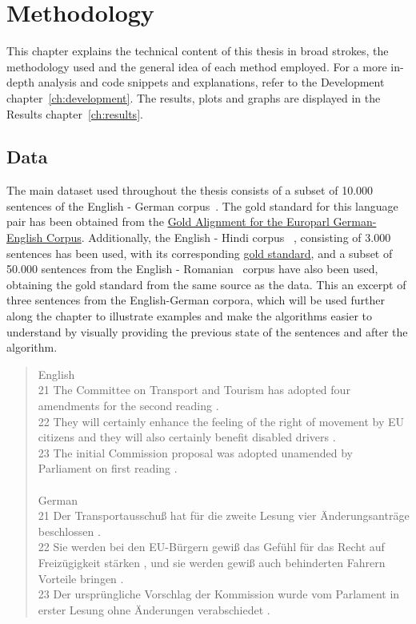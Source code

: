 %
%

\chapter{Methodology}\label{ch:methodology}

This chapter explains the technical content of this thesis in broad strokes, the methodology used and the general idea of each method employed. For a more in-depth analysis and code snippets and explanations, refer to the Development chapter~\ref{ch:development}. The results, plots and graphs are displayed in the Results chapter~\ref{ch:results}.

\section{Data}

The main dataset used throughout the thesis consists of a subset of 10.000 sentences of the English - German corpus~\cite{koehn2005epc}. The gold standard for this language pair has been obtained from the \href{http://www-i6.informatik.rwth-aachen.de/goldAlignment/}{Gold Alignment for the Europarl German-English Corpus}. Additionally, the English - Hindi corpus ~\cite{mcenery2000emille}, consisting of 3.000 sentences has been used, with its corresponding \href{https://web.eecs.umich.edu/~mihalcea/wpt05/}{gold standard}, and a subset of 50.000 sentences from the English - Romanian~\cite{mihalcea2003evaluation} corpus have also been used, obtaining the gold standard from the same source as the data. This an excerpt of three sentences from the English-German corpora, which will be used further along the chapter to illustrate examples and make the algorithms easier to understand by visually providing the previous state of the sentences and after the algorithm.

\begin{quote}
	English\\
	21	The Committee on Transport and Tourism has adopted four amendments for the second reading .\\
	22	They will certainly enhance the feeling of the right of movement by EU citizens and they will also certainly benefit disabled drivers .\\
	23	The initial Commission proposal was adopted unamended by Parliament on first reading .\\\\
	German\\
	21	Der Transportausschuß hat für die zweite Lesung vier Änderungsanträge beschlossen .\\
	22	Sie werden bei den EU-Bürgern gewiß das Gefühl für das Recht auf Freizügigkeit stärken , und sie werden gewiß auch behinderten Fahrern Vorteile bringen .\\
	23	Der ursprüngliche Vorschlag der Kommission wurde vom Parlament in erster Lesung ohne Änderungen verabschiedet .
\end{quote}

